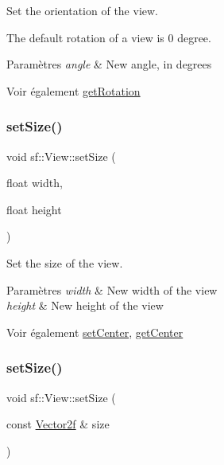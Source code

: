 Set the orientation of the view. 

The default rotation of a view is 0 degree.


\begin{DoxyParams}{Paramètres}
{\em angle} & New angle, in degrees\\
\hline
\end{DoxyParams}
\begin{DoxySeeAlso}{Voir également}
\hyperlink{classsf_1_1View_a324d8885f4ab17f1f7b0313580c9b84e}{get\+Rotation} 
\end{DoxySeeAlso}
\mbox{\label{classsf_1_1View_a9525b73fe9fbaceb9568faf56b399dab}} 
\subsubsection{\texorpdfstring{set\+Size()}{setSize()}\hspace{0.1cm}{\footnotesize\ttfamily [1/2]}}
{\footnotesize\ttfamily void sf\+::\+View\+::set\+Size (\begin{DoxyParamCaption}\item[{float}]{width,  }\item[{float}]{height }\end{DoxyParamCaption})}



Set the size of the view. 


\begin{DoxyParams}{Paramètres}
{\em width} & New width of the view \\
\hline
{\em height} & New height of the view\\
\hline
\end{DoxyParams}
\begin{DoxySeeAlso}{Voir également}
\hyperlink{classsf_1_1View_aa8e3fedb008306ff9811163545fb75f2}{set\+Center}, \hyperlink{classsf_1_1View_a7f4443c194c691ae4dcf8fd9dd0eaa46}{get\+Center} 
\end{DoxySeeAlso}
\mbox{\label{classsf_1_1View_a9e08d471ce21aa0e69ce55ff9de66d29}} 
\subsubsection{\texorpdfstring{set\+Size()}{setSize()}\hspace{0.1cm}{\footnotesize\ttfamily [2/2]}}
{\footnotesize\ttfamily void sf\+::\+View\+::set\+Size (\begin{DoxyParamCaption}\item[{const \hyperlink{classsf_1_1Vector2}{Vector2f} \&}]{size }\end{DoxyParamCaption})}



